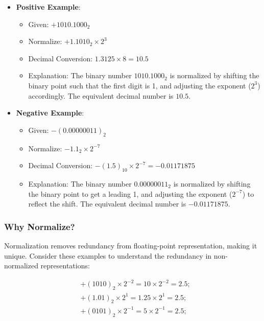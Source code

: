 \documentclass[12pt,openany, tikz,border=10pt]{book}
\begin{document}
    \begin{itemize}
        \item[] \textbf{Positive Example}:
        \begin{itemize}
            \item[] Given: \( +1010.1000_2 \)
            \item[] Normalize: \( +1.1010_2 \times 2^3 \)
            \item[] Decimal Conversion: \( 1.3125 \times 8 = 10.5 \)
            \item[] Explanation: The binary number \(1010.1000_2\) is normalized by shifting the binary point such that the first digit is 1, and adjusting the exponent (\(2^3\)) accordingly. The equivalent decimal number is \(10.5\).
        \end{itemize}
    \newpage
        \item[] \textbf{Negative Example}:
        \begin{itemize}
            \item[] Given: \( -(0.00000011)_2 \)
            \item[] Normalize: \( -1.1_2 \times 2^{-7} \)
            \item[] Decimal Conversion: \( -(1.5)_{10} \times 2^{-7} = -0.01171875 \)
            \item[] Explanation: The binary number \(0.00000011_2\) is normalized by shifting the binary point to get a leading 1, and adjusting the exponent (\(2^{-7}\)) to reflect the shift. The equivalent decimal number is \(-0.01171875\).
        \end{itemize}
    \end{itemize}
    
    \subsubsection{Why Normalize?}
    
    Normalization removes redundancy from floating-point representation, making it unique. Consider these examples to understand the redundancy in non-normalized representations:

        \[
            \begin{aligned}
            & + (1010)_2 \times 2^{-2} = 10 \times 2^{-2} = 2.5; \\
            & + (1.01)_2 \times 2^{1} = 1.25 \times 2^{1} = 2.5; \\
            & + (0101)_2 \times 2^{-1} = 5 \times 2^{-1}  = 2.5; \\
            \end{aligned}
            \]
\end{document}
